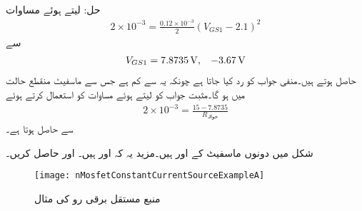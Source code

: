 حل: لیتے ہوئے مساوات 
\begin{align*}
2 \times 10^{-3}=\frac{0.12 \times 10^{-3}}{2} \left(V_{GS1}-2.1 \right)^2
\end{align*}
سے
\begin{align*}
V_{GS1}=\SI{7.8735}{\volt}, \hspace{3mm} \SI{-3.67}{\volt}
\end{align*}
 حاصل ہوتے ہیں۔منفی جواب کو رد کیا جاتا ہے چونکہ یہ  سے کم ہے جس سے ماسفیٹ منقطع حالت میں ہو گا۔مثبت جواب کو لیتے ہوئے مساوات  کو استعمال کرتے ہوئے
\begin{align*}
2 \times 10^{-3}=\frac{15-7.8735}{R_{\text{حوالہ}}}
\end{align*}
سے  حاصل ہوتا ہے۔

شکل  میں دونوں ماسفیٹ کے  اور  ہیں۔مزید یہ کہ  اور  ہیں۔ اور  حاصل کریں۔

\begin{figure}
\centering
\texttt{[image: nMosfetConstantCurrentSourceExampleA]}
\caption{منبع مستقل برقی رو کی مثال}
\label{شکل_ماسفیٹ_پیداکار_مستقل_برقی_رو_استعمال}
\end{figure}

